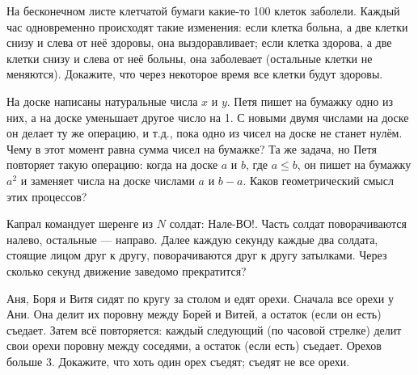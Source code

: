 \documentclass[a4paper,12pt]{article}
\begin{document}
На бесконечном листе клетчатой бумаги какие-то 100 клеток  заболели. Каждый час одновременно происходят такие изменения: если клетка больна, а две клетки снизу и слева от неё здоровы, она выздоравливает;
если клетка здорова, а две клетки
снизу и слева от неё больны, она заболевает
(остальные клетки не меняются). %
Докажите, что через некоторое время все клетки будут здоровы.


На доске написаны натуральные числа $x$ и $y$.
Петя пишет на бумажку одно из них, а на доске
уменьшает другое число на 1. С новыми двумя числами на доске
он делает ту же операцию, и т.д., пока
одно из чисел на доске не станет нулём.
Чему в этот момент равна сумма чисел на бумажке?
 Та же задача, но Петя повторяет такую операцию:
когда на доске $a$ и $b$, где $a\leq b$,
он пишет на бумажку $a^2$ и заменяет
числа на доске числами $a$ и $b-a$.
Каков геометрический смысл этих процессов?


Капрал командует  шеренге из $N$ солдат:  Нале-ВО!.
Часть солдат поворачиваются налево, остальные ---
направо. Далее %
каждую секунду каждые два солдата, стоящие
лицом друг к другу, поворачиваются друг к другу затылками.
Через сколько секунд движение заведомо прекратится?






Аня, Боря и Витя сидят по кругу за столом и едят орехи. Сначала все
орехи у Ани. Она делит их поровну между Борей и Витей, а остаток (если
он есть) съедает. Затем всё повторяется: каждый следующий (по часовой
стрелке) делит свои орехи поровну между  соседями, а остаток
(если есть) съедает. Орехов больше 3.
Докажите, что
 хоть один орех съедят;
 съедят не все орехи.
\end{document}
